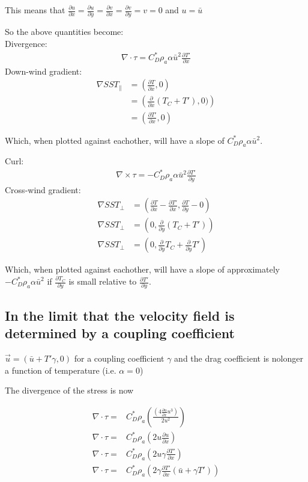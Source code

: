 \documentclass[12pt,a4paper]{article}
\newcommand{\dudx}{\frac{\partial u}{\partial x}}
\newcommand{\dudy}{\frac{\partial u}{\partial y}}
\newcommand{\dvdx}{\frac{\partial v}{\partial x}}
\newcommand{\dvdy}{\frac{\partial v}{\partial y}}
\newcommand{\dTdx}{\frac{\partial T}{\partial x}}
\newcommand{\dTdy}{\frac{\partial T}{\partial y}}
\newcommand{\dTpdx}{\frac{\partial T'}{\partial x}}
\newcommand{\dTpdy}{\frac{\partial T'}{\partial y}}
\begin{document}
This means that $\dudx = \dudy = \dvdx = \dvdy = v = 0$ and $u=\bar{u}$

So the above quantities become:\\
Divergence:
\begin{align*}
\nabla \cdot \tau = C_D^* \rho_a \alpha\bar{u}^2\dTpdx
\end{align*}
Down-wind gradient:
\begin{align*}
\nabla SST_{\parallel} &= \left( \dTdx , 0 \right) \\
&= \left( \frac{\partial}{\partial x}(T_C + T') , 0) \right)\\
&= \left( \dTpdx, 0 \right)
\end{align*}

Which, when plotted against eachother, will have a slope of $ C_D^* \rho_a \alpha\bar{u}^2$.\\
\vspace*{0.5in}

Curl:
\begin{align*}
\nabla \times \tau = -C_D^* \rho_a \alpha\bar{u}^2\dTpdy
\end{align*}
Cross-wind gradient:
\begin{align*}
\nabla SST_{\bot} &= \left(\dTdx- \dTpdx , \dTdy- 0 \right)\\
\nabla SST_{\bot} &= \left(0 , \frac{\partial}{\partial y}(T_C + T') \right)\\
\nabla SST_{\bot} &= \left(0 , \frac{\partial}{\partial y}T_C+ \frac{\partial}{\partial y}T' \right)
\end{align*}

Which, when plotted against eachother, will have a slope of approximately $ -C_D^* \rho_a \alpha\bar{u}^2$ if $\frac{\partial T_C}{\partial y}$ is small relative to $\dTpdy$.

\subsection{In the limit that the velocity field is determined by a coupling coefficient }\label{sec:A_uT}
 $\vec{u} = (\bar{u} + T' \gamma, 0)$ for a coupling coefficient $\gamma$ and the drag coefficient is nolonger a function of temperature (i.e. $\alpha = 0$)

The divergence of the stress is now

\begin{align*}
\nabla \cdot \tau =& C_D^* \rho_a \left( \frac{(4\dudx u^3)}{2u^2} \right)\\
\nabla \cdot \tau =& C_D^* \rho_a \left( 2u\dudx \right)\\
\nabla \cdot \tau =& C_D^* \rho_a \left( 2u\gamma\dTpdx  \right)\\
\nabla \cdot \tau =& C_D^* \rho_a \left( 2\gamma\dTpdx (\bar{u} + \gamma T') \right)
\end{align*}
\end{document}
